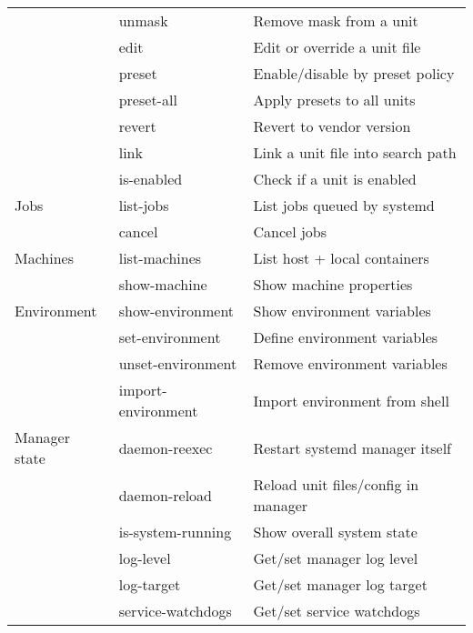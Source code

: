 \documentclass[openany, 12pt]{book}
\begin{document}
\begin{longtable}{lll}
                & unmask                 & Remove mask from a unit                 \\
                & edit                   & Edit or override a unit file            \\
                & preset                 & Enable/disable by preset policy         \\
                & preset-all             & Apply presets to all units              \\
                & revert                 & Revert to vendor version                \\
                & link                   & Link a unit file into search path       \\
                & is-enabled             & Check if a unit is enabled              \\
  \midrule
  Jobs          & list-jobs              & List jobs queued by systemd             \\
                & cancel                 & Cancel jobs                             \\
  \midrule
  Machines      & list-machines          & List host + local containers            \\
                & show-machine           & Show machine properties                 \\
  \midrule
  Environment   & show-environment       & Show environment variables              \\
                & set-environment        & Define environment variables            \\
                & unset-environment      & Remove environment variables            \\
                & import-environment     & Import environment from shell           \\
  \midrule
  Manager state & daemon-reexec          & Restart systemd manager itself          \\
                & daemon-reload          & Reload unit files/config in manager     \\
                & is-system-running      & Show overall system state               \\
                & log-level              & Get/set manager log level               \\
                & log-target             & Get/set manager log target              \\
                & service-watchdogs      & Get/set service watchdogs               \\

\end{longtable}
\end{document}
